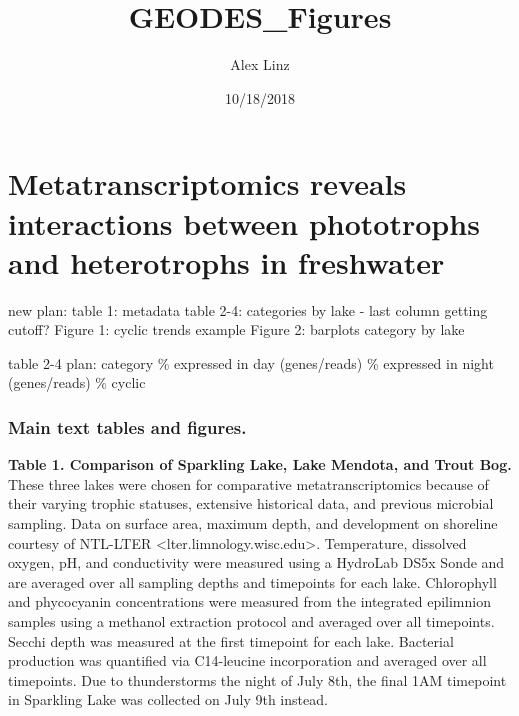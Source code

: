 \documentclass[]{article}
\title{GEODES\_Figures}
\author{Alex Linz}
\date{10/18/2018}
\begin{document}
\maketitle

\section{Metatranscriptomics reveals interactions between phototrophs
and heterotrophs in
freshwater}\label{metatranscriptomics-reveals-interactions-between-phototrophs-and-heterotrophs-in-freshwater}

new plan: table 1: metadata table 2-4: categories by lake - last column
getting cutoff? Figure 1: cyclic trends example Figure 2: barplots
category by lake

table 2-4 plan: category\textbar{} \% expressed in day (genes/reads)
\textbar{} \% expressed in night (genes/reads) \textbar{} \% cyclic

\subsubsection{Main text tables and
figures.}\label{main-text-tables-and-figures.}

\textbf{Table 1. Comparison of Sparkling Lake, Lake Mendota, and Trout
Bog.} These three lakes were chosen for comparative metatranscriptomics
because of their varying trophic statuses, extensive historical data,
and previous microbial sampling. Data on surface area, maximum depth,
and development on shoreline courtesy of NTL-LTER
\textless{}lter.limnology.wisc.edu\textgreater{}. Temperature, dissolved
oxygen, pH, and conductivity were measured using a HydroLab DS5x Sonde
and are averaged over all sampling depths and timepoints for each lake.
Chlorophyll and phycocyanin concentrations were measured from the
integrated epilimnion samples using a methanol extraction protocol and
averaged over all timepoints. Secchi depth was measured at the first
timepoint for each lake. Bacterial production was quantified via
C14-leucine incorporation and averaged over all timepoints. Due to
thunderstorms the night of July 8th, the final 1AM timepoint in
Sparkling Lake was collected on July 9th instead.
\end{document}
